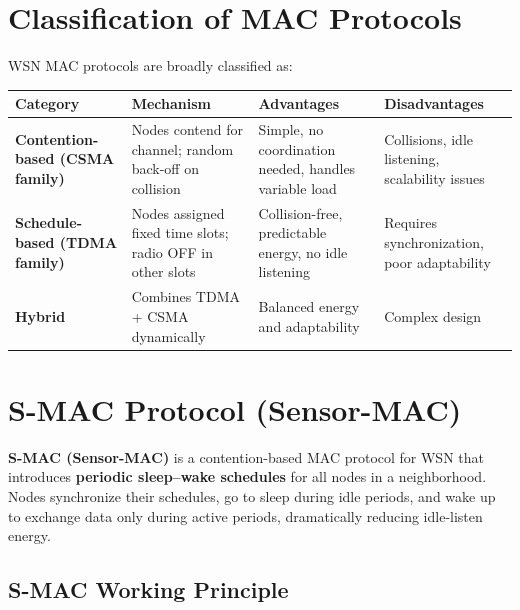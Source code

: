 \documentclass[12pt,a4paper]{article}
\renewcommand{\arraystretch}{1.45}
\begin{document}
\section{Classification of MAC Protocols}

WSN MAC protocols are broadly classified as:

\par\noindent
{\renewcommand{\arraystretch}{1.5}%
\begin{tabularx}{\linewidth}{|B{3.0cm}|Y|Y|Y|}
\hline
\textbf{Category} & \textbf{Mechanism} & \textbf{Advantages} & \textbf{Disadvantages} \\
\hline
\textbf{Contention-based (CSMA family)} & Nodes contend for channel; random back-off on collision & Simple, no coordination needed, handles variable load & Collisions, idle listening, scalability issues \\
\hline
\textbf{Schedule-based (TDMA family)} & Nodes assigned fixed time slots; radio OFF in other slots & Collision-free, predictable energy, no idle listening & Requires synchronization, poor adaptability \\
\hline
\textbf{Hybrid} & Combines TDMA + CSMA dynamically & Balanced energy and adaptability & Complex design \\
\hline
\end{tabularx}}

\section{S-MAC Protocol (Sensor-MAC)}

\begin{tcolorbox}[defbox, title={\textbf{S-MAC --- Definition}}]
\textbf{S-MAC (Sensor-MAC)} is a contention-based MAC protocol for WSN that introduces \textbf{periodic sleep--wake schedules} for all nodes in a neighborhood. Nodes synchronize their schedules, go to sleep during idle periods, and wake up to exchange data only during active periods, dramatically reducing idle-listen energy.
\end{tcolorbox}

\subsection{S-MAC Working Principle}
\end{document}
